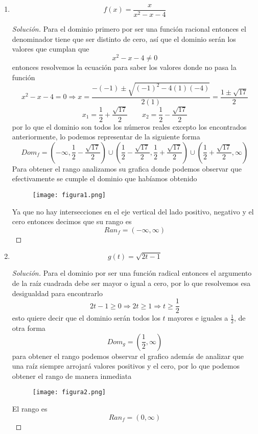 \documentclass[12pt]{article}
\newenvironment{solution}{\begin{proof}[Solución]}{\end{proof}}
\begin{document}
\begin{enumerate}
    \item \[f(x) = \frac{x}{x^2-x-4}\]\begin{solution}
        Para el dominio primero por ser una función racional entonces el denominador tiene que ser distinto de cero, así que el dominio serán los valores que cumplan que \[x^2-x-4 \neq 0\] entonces resolvemos la ecuación para saber los valores donde no pasa la función
        \[x^2-x-4 = 0 \Rightarrow x = \frac{-(-1) \pm \sqrt{(-1)^2-4(1)(-4)}}{2(1)} = \frac{1 \pm \sqrt{17}}{2}\]
        \[x_1 = \frac{1}{2} + \frac{\sqrt{17}}{2} \qquad x_2 = \frac{1}{2} - \frac{\sqrt{17}}{2}\]
        por lo que el dominio son todos los números reales excepto los encontrados anteriormente, lo podemos representar de la siguiente forma
        \[Dom_f = \left(-\infty, \frac{1}{2} - \frac{\sqrt{17}}{2}\right) \cup \left(\frac{1}{2} - \frac{\sqrt{17}}{2}, \frac{1}{2} + \frac{\sqrt{17}}{2}\right) \cup \left(\frac{1}{2} + \frac{\sqrt{17}}{2}, \infty\right)\]
        Para obtener el rango analizamos su grafica donde podemos observar que efectivamente se cumple el dominio que habíamos obtenido 
        \begin{figure}[H]
            \centering
            \texttt{[image: figura1.png]}
        \end{figure}
        Ya que no hay intersecciones en el eje vertical del lado positivo, negativo y el cero entonces decimos que su rango es
        \[Ran_f = (-\infty,\infty)\]
    \end{solution}
    \item \[g(t) = \sqrt{2t-1}\]\begin{solution}
        Para el dominio por ser una función radical entonces el argumento de la raíz cuadrada debe ser mayor o igual a cero, por lo que resolvemos esa desigualdad para encontrarlo
        \[2t -1 \geq 0 \Rightarrow 2t \geq 1 \Rightarrow t \geq \frac{1}{2}\] 
        esto quiere decir que el dominio serán todos los $t$ mayores e iguales a $\frac{1}{2}$, de otra forma
        \[Dom_g = \left(\frac{1}{2} , \infty\right)\]
        para obtener el rango podemos observar el grafico además de analizar que una raíz siempre arrojará valores positivos y el cero, por lo que podemos obtener el rango de manera inmediata 
        \begin{figure}[H]
            \centering
            \texttt{[image: figura2.png]}
        \end{figure}
        El rango es
        \[Ran_f = (0,\infty)\]

\end{solution}
\end{enumerate}
\end{document}
